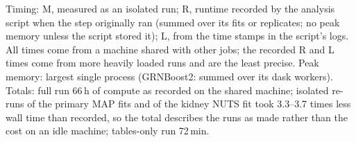 \begin{table}[tbp]
\begin{minipage}{\linewidth}
Timing: M, measured as an isolated run; R, runtime recorded by the analysis script when the step originally ran (summed over its fits or replicates; no peak memory unless the script stored it); L, from the time stamps in the script's logs. All times come from a machine shared with other jobs; the recorded R and L times come from more heavily loaded runs and are the least precise. Peak memory: largest single process (GRNBoost2: summed over its dask workers). Totals: full run 66\,h of compute as recorded on the shared machine; isolated re-runs of the primary MAP fits and of the kidney NUTS fit took 3.3--3.7 times less wall time than recorded, so the total describes the runs as made rather than the cost on an idle machine; tables-only run 72\,min.
\end{minipage}
\end{table}

